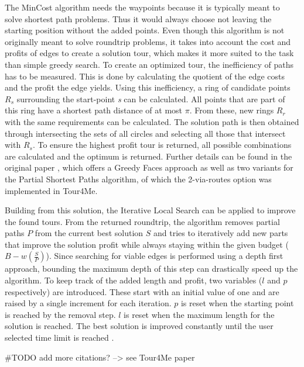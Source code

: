 The MinCost algorithm needs the waypoints because it is typically meant to solve shortest path problems. 
Thus it would always choose not leaving the starting position without the added points. 
Even though this algorithm is not originally meant to solve roundtrip problems, it takes into account the cost and profits of edges to create a solution tour, which makes it more suited to the task than simple greedy search.
To create an optimized tour, the inefficiency of paths has to be measured. 
This is done by calculating the quotient of the edge costs and the profit the edge yields. 
Using this inefficiency, a ring of candidate points $R_s$ surrounding the start-point \textit{s} can be calculated.
All points that are part of this ring have a shortest path distance of at most $\pi$.
From these, new rings $R_r$ with the same requirements can be calculated. 
The solution path is then obtained through intersecting the sets of all circles and selecting all those that intersect with $R_s$.
To ensure the highest profit tour is returned, all possible combinations are calculated and the optimum is returned\cite{buchin_tour4me_2022}. 
Further details can be found in the original paper \cite{gemsa_efficient_2013}, which offers a Greedy Faces approach as well as two variants for the Partial Shortest Paths algorithm, of which the 2-via-routes option was implemented in Tour4Me.

Building from this solution, the Iterative Local Search can be applied to improve the found tours.
From the returned roundtrip, the algorithm removes partial paths $P$ from the current best solution $S$ and tries to iteratively add new parts that improve the solution profit while always staying within the given budget ($B-w(\frac{S}{P})$).
Since searching for viable edges is performed using a depth first approach, bounding the maximum depth of this step can drastically speed up the algorithm.
To keep track of the added length and profit, two variables ($l$ and $p$ respectively) are introduced.
These start with an initial value of one and are raised by a single increment for each iteration.
$p$ is reset when the starting point is reached by the removal step.
$l$ is reset when the maximum length for the solution is reached.
The best solution is improved constantly until the user selected time limit is reached \cite{buchin_tour4me_2022}.

\#TODO add more citations? --> see Tour4Me paper


